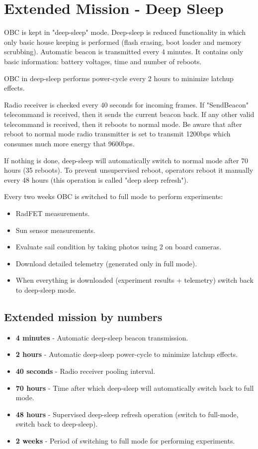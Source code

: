 \section{Extended Mission - Deep Sleep}
\label{Extended Mission}

OBC is kept in "deep-sleep" mode. Deep-sleep is reduced functionality in which only basic house keeping is performed (flash erasing, boot loader and memory scrubbing). Automatic beacon is transmitted every 4 minutes. It contains only basic information: battery voltages, time and number of reboots.

OBC in deep-sleep performs power-cycle every 2 hours to minimize latchup effects. 
    
Radio receiver is checked every 40 seconds for incoming frames. If "SendBeacon" telecommand is received, then it sends the current beacon back. If any other valid telecommand is received, then it reboots to normal mode. Be aware that after reboot to normal mode radio transmitter is set to transmit 1200bps which consumes much more energy that 9600bps. 

If nothing is done, deep-sleep will automatically switch to normal mode after 70 hours (35 reboots). To prevent unsupervised reboot, operators reboot it manually every 48 hours (this operation is called "deep sleep refresh").
 
Every two weeks OBC is switched to full mode to perform experiments:
\begin{itemize}
    \item RadFET measurements.
    \item Sun sensor measurements.
    \item Evaluate sail condition by taking photos using 2 on board cameras.
    \item Download detailed telemetry (generated only in full mode).
    \item When everything is downloaded (experiment results + telemetry) switch back to deep-sleep mode.
\end{itemize}


\subsection{Extended mission by numbers}

\begin{itemize}
    \item \textbf{4 minutes} - Automatic deep-sleep beacon transmission.
    \item \textbf{2 hours} - Automatic deep-sleep power-cycle to minimize latchup effects.
    \item \textbf{40 seconds} - Radio receiver pooling interval.
    \item \textbf{70 hours} - Time after which deep-sleep will automatically switch back to full mode.
    \item \textbf{48 hours} - Supervised deep-sleep refresh operation (switch to full-mode, switch back to deep-sleep).
    \item \textbf{2 weeks} - Period of switching to full mode for performing experiments.
\end{itemize}
